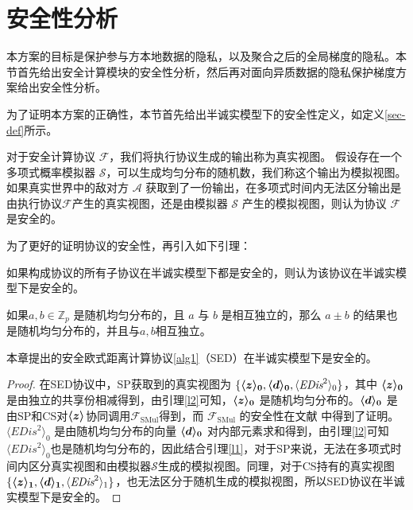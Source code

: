 \section{安全性分析}\label{4-analysis}
本方案的目标是保护参与方本地数据的隐私，以及聚合之后的全局梯度的隐私。本节首先给出安全计算模块的安全性分析，然后再对面向异质数据的隐私保护梯度方案给出安全性分析。

为了证明本方案的正确性，本节首先给出半诚实模型下的安全性定义，如定义\ref{sec-def}所示。

\begin{definition}\label{sec-def}	
	对于安全计算协议 $\mathcal{F}$，我们将执行协议生成的输出称为真实视图。
	假设存在一个多项式概率模拟器 $\mathcal{S}$，可以生成均匀分布的随机数，我们称这个输出为模拟视图。如果真实世界中的敌对方 $\mathcal{A}$ 获取到了一份输出，在多项式时间内无法区分输出是由执行协议$\mathcal{F}$产生的真实视图，还是由模拟器 $\mathcal{S}$ 产生的模拟视图，则认为协议 $\mathcal{F}$ 是安全的。
\end{definition}

为了更好的证明协议的安全性，再引入如下引理：
\begin{lemma}\label{l1}
	如果构成协议的所有子协议在半诚实模型下都是安全的，则认为该协议在半诚实模型下是安全的\cite{bi2020design}。
\end{lemma}

\begin{lemma}\label{l2}
	如果$ a, b \in \mathbb{Z}_p$ 是随机均匀分布的，且 $a$ 与 $b$ 是相互独立的，那么 $a \pm b$ 的结果也是随机均匀分布的，并且与$a,b$相互独立\cite{bogdanov2008sharemind}。
\end{lemma}

\begin{theorem}
	本章提出的安全欧式距离计算协议\ref{alg1}（SED）在半诚实模型下是安全的。
\end{theorem}

\begin{proof}\label{p1}
	在SED协议中，SP获取到的真实视图为 $\{\svec[0]{z}, \svec[0]{d}, \langle \textit{EDis}^2\rangle_0\}$，其中 $\svec[0]{z}$ 是由独立的共享份相减得到，由引理\ref{l2}可知，$\svec[0]{z}$ 是随机均匀分布的。$\svec[0]{d}$ 是由SP和CS对$\svec{z}$协同调用$\mathcal{F}_{\text {SMul}}$得到，而 $\mathcal{F}_{\text {SMul}}$ 的安全性在文献 \cite{rathee2021sirnn} 中得到了证明。$\langle \textit{EDis}^2\rangle_0$ 是由随机均匀分布的向量 $\svec[0]{d}$ 对内部元素求和得到，由引理\ref{l2}可知$\langle \textit{EDis}^2\rangle_0$也是随机均匀分布的，因此结合引理\ref{l1}，对于SP来说，无法在多项式时间内区分真实视图和由模拟器$\mathcal{S}$生成的模拟视图。同理，对于CS持有的真实视图 $\{\svec[1]{z}, \svec[1]{d}, \langle \textit{EDis}^2\rangle_1\}$，也无法区分于随机生成的模拟视图，所以SED协议在半诚实模型下是安全的。
\end{proof}

